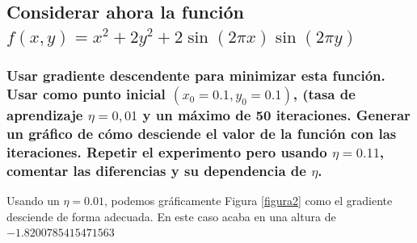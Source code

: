 \documentclass[12pt,a4paper]{article}
\begin{document}
\subsection{Considerar ahora la función \(  f(x,y)=x^2+2y^2+2\sin(2\pi x)\sin(2\pi y)\)}
\subsubsection{Usar gradiente descendente para minimizar esta función. Usar como punto inicial \((x_{0}=0.1, y_{0}=0.1)\), (tasa de aprendizaje \(\eta=0,01\) y un máximo de 50 iteraciones. Generar un gráfico de cómo desciende el valor de la función con las iteraciones. Repetir el experimento pero usando \(\eta=0.11\), comentar las diferencias y su dependencia de \(\eta\).}
Usando un \(\eta=0.01\), podemos gráficamente Figura  \ref{figura2} como el gradiente desciende de forma adecuada. En este caso acaba en una altura de \(-1.8200785415471563\)
\end{document}
